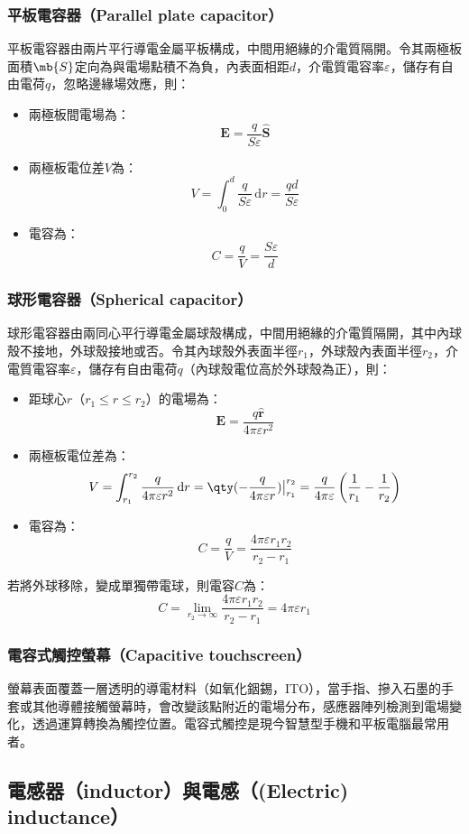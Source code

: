 \documentclass[a4paper,12pt]{report}
\begin{document}
\begin{itemize}
\subsubsection{平板電容器（Parallel plate capacitor）}
平板電容器由兩片平行導電金屬平板構成，中間用絕緣的介電質隔開。令其兩極板面積$\mb{S}$定向為與電場點積不為負，內表面相距$d$，介電質電容率$\varepsilon$，儲存有自由電荷$q$，忽略邊緣場效應，則：
\begin{itemize}
\item 兩極板間電場為：
\[\mathbf{E}=\frac{q}{S\varepsilon}\hat{\mathbf{S}}\]
\item 兩極板電位差$V$為：
\[V=\int_0^d\frac{q}{S\varepsilon}\,\mathrm{d}r=\frac{qd}{S\varepsilon}\]
\item 電容為：
\[C = \frac{q}{V} = \frac{S\varepsilon}{d}\]
\end{itemize}
\subsubsection{球形電容器（Spherical capacitor）}
球形電容器由兩同心平行導電金屬球殼構成，中間用絕緣的介電質隔開，其中內球殼不接地，外球殼接地或否。令其內球殼外表面半徑$r_1$，外球殼內表面半徑$r_2$，介電質電容率$\varepsilon$，儲存有自由電荷$q$（內球殼電位高於外球殼為正），則：
\begin{itemize}
\item 距球心$r$（$r_1\leq r\leq r_2$）的電場為：
\[\mathbf{E} = \frac{q\hat{\mathbf{r}}}{4\pi\varepsilon r^2}\]
\item 兩極板電位差為：
\[V=\int_{r_1}^{r_2}\frac{q}{4\pi\varepsilon r^2}\,\mathrm{d}r=\qty(-\frac{q}{4\pi\varepsilon r})\big\vert_{r_1}^{r_2}=\frac{q}{4\pi\varepsilon}\left(\frac{1}{r_1}-\frac{1}{r_2}\right)\]
\item 電容為：
\[C = \frac{q}{V}=\frac{4\pi\varepsilon r_1r_2}{r_2-r_1}\]
\end{itemize}
若將外球移除，變成單獨帶電球，則電容$C$為：
\[C = \lim_{r_2\to\infty}\frac{4\pi\varepsilon r_1r_2}{r_2-r_1}=4\pi\varepsilon r_1\]
\subsubsection{電容式觸控螢幕（Capacitive touchscreen）}
螢幕表面覆蓋一層透明的導電材料（如氧化銦錫，ITO），當手指、摻入石墨的手套或其他導體接觸螢幕時，會改變該點附近的電場分布，感應器陣列檢測到電場變化，透過運算轉換為觸控位置。電容式觸控是現今智慧型手機和平板電腦最常用者。
\subsection{電感器（inductor）與電感（(Electric) inductance）}

\end{itemize}
\end{document}
